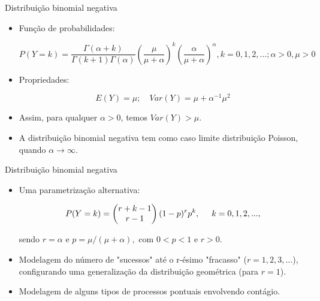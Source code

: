 \documentclass[10pt, aspectratio=169]{beamer}
\begin{document}


\begin{frame}{Distribuição binomial negativa} 

\begin{itemize}

\item Função de probabilidades:

$$
P(Y=k)=\frac{\Gamma(\alpha+k)}{\Gamma(k+1)\Gamma(\alpha)}\left ( \frac{\mu}{\mu+\alpha} \right )^{k} \left( \frac{\alpha}{\mu+\alpha} \right )^{\alpha}, k=0,1,2,...; \alpha > 0, \mu>0
$$

\item Propriedades:

$$
E(Y)=\mu ; \quad Var(Y)= \mu+ \alpha^{-1} \mu^2
$$

\item Assim, para qualquer $\alpha>0$, temos $Var(Y)>\mu$.

\item A distribuição binomial negativa tem como caso limite distribuição Poisson, quando $\alpha \rightarrow \infty$.


\end{itemize}

\end{frame}




\begin{frame}{Distribuição binomial negativa} 

\begin{itemize}

\item Uma parametrização alternativa:

\vspace{0.5cm}

$$
P(Y=k) = \left ( \begin{matrix}
r+k-1\\ 
r-1
\end{matrix} \right ) (1-p)^rp^k, \hspace{0,5cm} k=0,1,2,...,
$$

\vspace{0.5cm}

sendo $r=\alpha$ e $p=\mu/(\mu+\alpha),$ com $0<p<1$ e $r>0$.  
\vspace{0.5cm}

\item Modelagem do número de "sucessos" até o r-ésimo "fracasso" ($r = 1,2,3,...$), configurando uma generalização da distribuição geométrica (para $r=1$).

\vspace{0.5cm}

\item Modelagem de alguns tipos de processos pontuais envolvendo contágio.

\end{itemize}

\end{frame}
\end{document}
